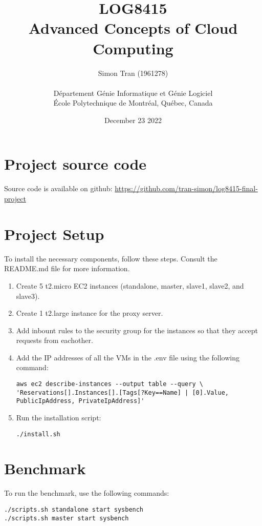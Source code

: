 \documentclass[11pt]{article}
\title{LOG8415\\Advanced Concepts of Cloud Computing}
\author{
    Simon Tran (1961278) \\ \\
    D\'{e}partement G\'{e}nie Informatique et G\'{e}nie Logiciel \\
    \'{E}cole Polytechnique de Montr\'{e}al, Qu\'{e}bec, Canada \\
}
\date{December 23 2022}
\begin{document}
    \maketitle


    \section{Project source code}
    Source code is available on github: \url{https://github.com/tran-simon/log8415-final-project}

    \section{Project Setup}
    To install the necessary components, follow these steps.
    Consult the README.md file for more information.

    \begin{enumerate}
        \item Create 5 t2.micro EC2 instances (standalone, master, slave1, slave2, and slave3).
        \item Create 1 t2.large instance for the proxy server.
        \item Add inbount rules to the security group for the instances so that they accept requests from eachother.
        \item Add the IP addresses of all the VMs in the .env file using the following command:
        \begin{verbatim}
aws ec2 describe-instances --output table --query \
'Reservations[].Instances[].[Tags[?Key==Name] | [0].Value, PublicIpAddress, PrivateIpAddress]'
        \end{verbatim}
        \item Run the installation script:
        \begin{verbatim}
./install.sh
        \end{verbatim}
    \end{enumerate}


    \section{Benchmark}
    To run the benchmark, use the following commands:

    \begin{verbatim}
./scripts.sh standalone start sysbench
./scripts.sh master start sysbench
    \end{verbatim}
\end{document}
